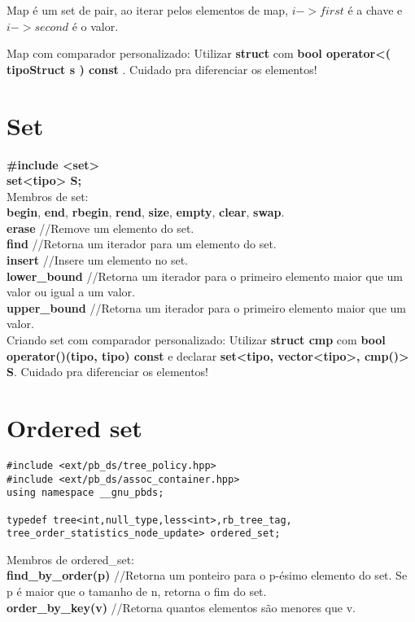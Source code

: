 \begin{multicols}{2}
Map é um set de pair, ao iterar pelos elementos de map, $i->first$ é a chave e $i->second$ é o valor.

Map com comparador personalizado: Utilizar \textbf{struct} com \textbf{bool operator<( tipoStruct s ) const {}}. Cuidado pra diferenciar os elementos!

\section{Set}

\textbf{\#include <set>}\\
\textbf{set<tipo> S;}\\

Membros de set:\\
\textbf{begin}, \textbf{end}, \textbf{rbegin}, \textbf{rend}, \textbf{size}, \textbf{empty}, \textbf{clear}, \textbf{swap}.\\
\textbf{erase} //Remove um elemento do set.\\
\textbf{find} //Retorna um iterador para um elemento do set.\\
\textbf{insert} //Insere um elemento no set.\\
\textbf{lower\_bound} //Retorna um iterador para o primeiro elemento maior que um valor ou igual a um valor.\\
\textbf{upper\_bound} //Retorna um iterador para o primeiro elemento maior que um valor.\\

Criando set com comparador personalizado: Utilizar \textbf{struct cmp} com \textbf{bool operator()(tipo, tipo) const {}} e declarar \textbf{set<tipo, vector<tipo>, cmp()> S}. Cuidado pra diferenciar os elementos!

\section{Ordered set}

\begin{lstlisting}
#include <ext/pb_ds/tree_policy.hpp>
#include <ext/pb_ds/assoc_container.hpp>
using namespace __gnu_pbds;

typedef tree<int,null_type,less<int>,rb_tree_tag,
tree_order_statistics_node_update> ordered_set;
\end{lstlisting}

Membros de ordered\_set:\\
\textbf{find\_by\_order(p)}	//Retorna um ponteiro para o p-ésimo elemento do set. Se p é maior que o tamanho de n, retorna o fim do set.\\
\textbf{order\_by\_key(v)}	//Retorna quantos elementos são menores que v.\\


\end{multicols}
